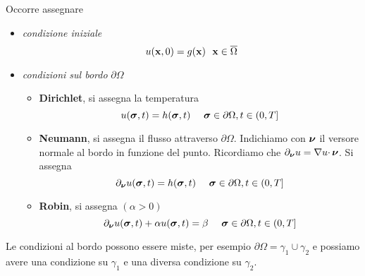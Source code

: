 Occorre assegnare
\begin{itemize}
    \item \textit{condizione iniziale}
          \begin{equation*}
              u(\mathbf{x},0) =g(\mathbf{x}) \ \ \mathbf{x} \in \overline{\Omega }
          \end{equation*}
    \item \textit{condizioni sul bordo} $\partial \Omega $
          \begin{itemize}
              \item \textbf{Dirichlet}, si assegna la temperatura
                    \begin{equation*}
                        u(\bm{\sigma},t) =h(\bm{\sigma},t) \ \ \ \ \bm{\sigma} \in \partial \Omega,t\in (0,T]
                    \end{equation*}
              \item \textbf{Neumann}, si assegna il flusso attraverso $\partial \Omega $. Indichiamo con $\bm{\nu}$ il versore normale al bordo in funzione del punto. Ricordiamo che $\partial _{\bm{\nu}} u=\nabla u\cdotp \bm{\nu}$. Si assegna
                    \begin{equation}
                        \partial _{\bm{\nu}}u(\bm{\sigma},t) =h(\bm{\sigma},t) \ \ \ \ \bm{\sigma} \in \partial \Omega,t\in (0,T]
                    \end{equation}
              \item \textbf{Robin}, si assegna $(\alpha  >0)$
                    \begin{equation*}
                        \partial _{\bm{\nu}} u(\bm{\sigma},t) +\alpha u(\bm{\sigma},t) =\beta \ \ \ \ \bm{\sigma} \in \partial \Omega,t\in (0,T]
                    \end{equation*}
          \end{itemize}
\end{itemize}

Le condizioni al bordo possono essere miste, per esempio $\partial \Omega =\gamma _{1} \cup \gamma _{2}$ e possiamo avere una condizione su $\gamma _{1}$ e una diversa condizione su $\gamma _{2}$.

